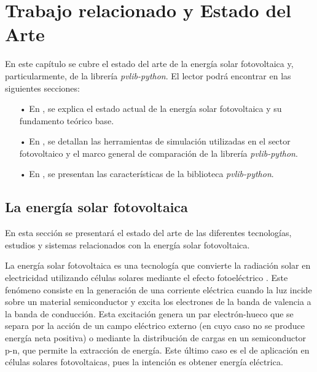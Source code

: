 \chapter{Trabajo relacionado y Estado del Arte} \label{chp:state-of-the-art}

En este capítulo se cubre el estado del arte de la energía solar fotovoltaica y, particularmente, de la librería \textit{pvlib-python}. El lector podrá encontrar en las siguientes secciones:

\begin{itemize}

      \item[•] En , se explica el estado actual de la energía solar fotovoltaica y su fundamento teórico base.

      \item[•] En , se detallan las herramientas de simulación utilizadas en el sector fotovoltaico y el marco general de comparación de la librería \textit{pvlib-python}.

      \item[•] En , se presentan las características de la biblioteca \textit{pvlib-python}.

\end{itemize}


\section{La energía solar fotovoltaica} \label{sct:energia-solar}

En esta sección se presentará el estado del arte de las diferentes tecnologías, estudios y sistemas relacionados con la energía solar fotovoltaica.

La energía solar fotovoltaica es una tecnología que convierte la radiación solar en electricidad utilizando células solares mediante el efecto fotoeléctrico \cite[][pp. 701-706]{böer2002survey}.
Este fenómeno consiste en la generación de una corriente eléctrica cuando la luz incide sobre un material semiconductor y excita los electrones de la banda de valencia a la banda de conducción. Esta excitación genera un par electrón-hueco que se separa por la acción de un campo eléctrico externo (en cuyo caso no se produce energía neta positiva) o mediante la distribución de cargas en un semiconductor p-n, que permite la extracción de energía. Este último caso es el de aplicación en células solares fotovoltaicas, pues la intención es obtener energía eléctrica.

